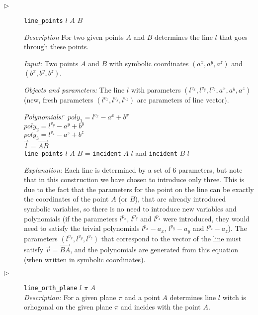 \documentclass{aicom2e}
\begin{document}
\begin{description}
\item[$\triangleright$] {\tt line\_points} $l$ $A$ $B$

  {\em Description} For two given points $A$ and $B$ determines the
  line $l$ that goes through these points.


  {\em Input:} Two points $A$ and $B$ with symbolic coordinates $(a^x,
  a^y, a^z)$ and $(b^x, b^y, b^z)$.

  {\em Objects and parameters:} The line $l$ with parameters
  $(l^{v_x}, l^{v_y}, l^{v_z}, a^x, a^y, a^z)$ (new, fresh parameters
  $(l^{v_x}, l^{v_y}, l^{v_z})$ are parameters of line vector).

\begin{tabbing}
{\em Polynomials:} \= $poly_1 = l^{v_x} - a^x + b^x$ \\
                   \> $poly_2 = l^{v_y} - a^y + b^y$ \\
                   \> $poly_3 = l^{v_z} - a^z + b^z$ \\
                   \> $\overrightarrow{l} = \overrightarrow{AB}$ \\
                   \> {\tt line\_points} $l$ $A$ $B$ = {\tt incident} $A$ $l$ and {\tt incident} $B$ $l$
\end{tabbing}

{\em Explanation:} Each line is determined by a set of 6 parameters,
but note that in this construction we have chosen to introduce only
three. This is due to the fact that the parameters for the point on
the line can be exactly the coordinates of the point $A$ (or $B$),
that are already introduced symbolic variables, so there is no need to
introduce new variables and polynomials (if the parameters $l^{p_x}$,
$l^{p_y}$ and $l^{p_z}$ were introduced, they would need to satisfy
the trivial polynomials $l^{p_x} - a_x$, $l^{p_y}-a_y$ and $l^{p_z} -
a_z$). The parameters $(l^{v_x}, l^{v_y}, l^{v_z})$ that correspond to
the vector of the line must satisfy $\overrightarrow{v} =
\overrightarrow{BA}$, and the polynomials are generated from this
equation (when written in symbolic coordinates).

\item[$\triangleright$] {\tt line\_orth\_plane} $l$ $\pi$ $A$ \\

{\em Description:} For a given plane $\pi$ and a point $A$ determines
line $l$ witch is orhogonal on the given plane $\pi$ and incides with
the point $A$.


\end{description}
\end{document}

